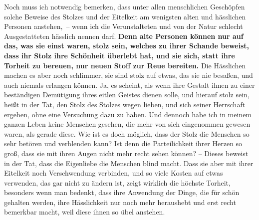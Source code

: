Noch muss ich notwendig bemerken, dass unter allen menschlichen Geschöpfen
solche
Beweise des Stolzes und der Eitelkeit am wenigsten alten und hässlichen Personen
anstehen,~-- wenn ich die Verunstalteten und von der Natur schlecht
Ausgestatteten hässlich nennen darf. \textbf{Denn alte Personen können nur auf
das, was
sie einst waren, stolz sein, welches zu ihrer Schande beweist, dass ihr Stolz
ihre Schönheit überlebt hat, und sie sich, statt ihre Torheit zu bereuen, nur
neuen Stoff zur Reue bereiten.} Die Hässlichen machen es aber noch schlimmer,
sie
sind stolz auf etwas, das sie nie besaßen, und auch niemals erlangen können. Ja,
es scheint, als wenn ihre Gestalt ihnen zu einer beständigen Demütigung ihres
eitlen Geistes dienen solle, und hierauf stolz sein, heißt in der Tat, den
Stolz des Stolzes wegen lieben, und sich seiner Herrschaft ergeben, ohne eine
Versuchung dazu zu haben. Und dennoch habe ich in meinem ganzen Leben keine
Menschen gesehen, die mehr von sich eingenommen gewesen waren, als gerade diese.
Wie ist es doch möglich, dass der Stolz die Menschen so sehr betören und
verblenden kann? Ist denn die Parteilichkeit ihrer Herzen so groß, dass sie mit
ihren Augen nicht mehr recht sehen können? -- Dieses beweist in der Tat, dass
die Eigenliebe die Menschen blind macht. Dass sie aber mit ihrer Eitelkeit noch
Verschwendung verbinden, und so viele Kosten auf etwas verwenden, das gar nicht
zu ändern ist, zeigt wirklich die höchste Torheit, besonders wenn man bedenkt,
dass ihre Anwendung der Dinge, die für schön gehalten werden, ihre Hässlichkeit
nur noch mehr heraushebt und erst recht bemerkbar macht, weil diese ihnen so
übel anstehen.

\medskip

